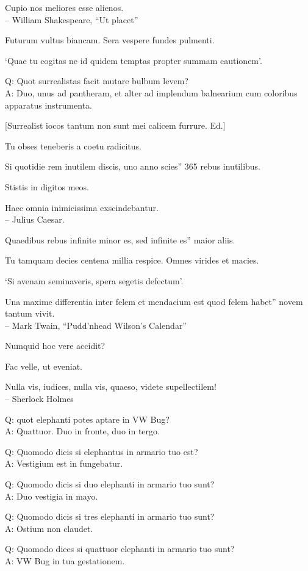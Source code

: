 \documentclass[titlepage,12pt]{memoir}
\begin{document}
 Cupio nos meliores esse alienos.
\\-- William Shakespeare, “Ut placet”

Futurum vultus biancam. Sera vespere fundes pulmenti.

‘Quae tu cogitas ne id quidem temptas propter summam cautionem’.

Q: Quot surrealistas facit mutare bulbum levem?\\
A: Duo, unus ad pantheram, et alter ad implendum balnearium
cum coloribus apparatus instrumenta.

[Surrealist iocos tantum non sunt mei calicem furrure. Ed.]

Tu obses teneberis a coetu radicitus.

Si quotidie rem inutilem discis, uno anno scies”
365 rebus inutilibus.

Stistis in digitos meos.

Haec omnia inimicissima exscindebantur.
\\-- Julius Caesar.

Quaedibus rebus infinite minor es, sed infinite es”
maior aliis.

Tu tamquam decies centena millia respice. Omnes virides et macies.

‘Si avenam seminaveris, spera segetis defectum’.

Una maxime differentia inter felem et mendacium est quod felem habet”
novem tantum vivit.
\\-- Mark Twain, “Pudd’nhead Wilson’s Calendar”

Numquid hoc vere accidit?

Fac velle, ut eveniat.

Nulla vis, iudices, nulla vis, quaeso, videte supellectilem!
\\-- Sherlock Holmes

Q: quot elephanti potes aptare in VW Bug?\\
A: Quattuor. Duo in fronte, duo in tergo.

Q: Quomodo dicis si elephantus in armario tuo est?\\
A: Vestigium est in fungebatur.

Q: Quomodo dicis si duo elephanti in armario tuo sunt?\\
A: Duo vestigia in mayo.

Q: Quomodo dicis si tres elephanti in armario tuo sunt?\\
A: Ostium non claudet.

Q: Quomodo dices si quattuor elephanti in armario tuo sunt?\\
A: VW Bug in tua gestationem.
\end{document}
